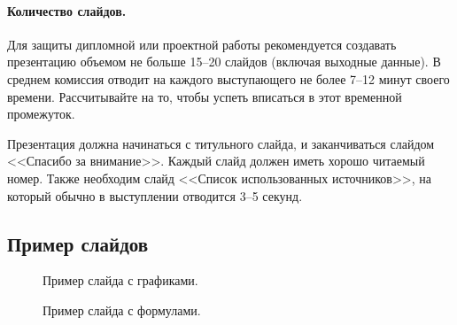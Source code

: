 \paragraph{Количество слайдов.} Для защиты дипломной или проектной работы рекомендуется создавать презентацию объемом не больше 15--20 слайдов (включая выходные данные). В среднем комиссия отводит на каждого выступающего не более 7--12 минут своего времени. Рассчитывайте на то, чтобы успеть вписаться в этот временной промежуток.
\par Презентация должна начинаться с титульного слайда, и заканчиваться слайдом <<Спасибо за внимание>>. Каждый слайд должен иметь хорошо читаемый номер. Также необходим слайд <<Список использованных источников>>, на который обычно в выступлении отводится 3--5 секунд. 
\subsection{Пример слайдов}
\begin{figure}[H]
\fboxsep=0mm
\centering
{}
\caption{Пример слайда с графиками.}
\label{pic-pres-graph}
\end{figure}
\begin{figure}[H]
\fboxsep=0mm
\centering
{}
\caption{Пример слайда с формулами.}
\label{pic-pres-formula}
\end{figure}







